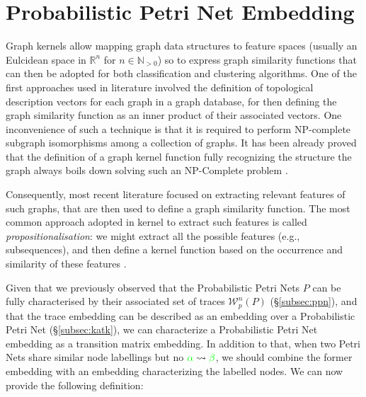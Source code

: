 \section{Probabilistic Petri Net Embedding}
Graph kernels allow mapping graph data structures to feature spaces (usually an Eulcidean space in $\mathbb{R}^n$ for $n\in \mathbb{N}_{>0}$) \cite{Samatova} so to express graph similarity functions that can then be adopted for both classification \cite{TsudaS10} and clustering \cite{Raedt} algorithms. One of the first approaches used in literature involved the definition of topological description vectors \cite{Sidere} for each graph in a graph database, for then defining the graph similarity function as an inner product of their associated vectors. One inconvenience of such a technique is that it is required to perform  NP-complete subgraph isomorphisms among a collection of graphs. It has been already proved that the definition of a graph kernel function fully recognizing the structure the graph always boils down solving such an NP-Complete problem \cite{GartnerFW03}. 


Consequently, most recent literature focused on extracting relevant features of such graphs, that are then used to define a graph similarity function. The most common approach adopted in kernel to extract such features is called \textit{propositionalisation}: we might extract all the possible features (e.g., subsequences), and then define a kernel function based on the occurrence and similarity of these features \cite{Gartner03}. 

Given that we previously observed that the Probabilistic Petri Nets $P$ can be fully characterised by their associated set of traces $\mathcal{W}_p^n(P)$ (\S\ref{subsec:ppn}), and that the trace embedding can be described as an embedding over a Probabilistic Petri Net (\S\ref{subsec:katk}), we can characterize a Probabilistic Petri Net embedding as a transition matrix embedding. In addition to that, when two Petri Nets share similar node labellings but no ${\color{green}\alpha}\rightsquigarrow{\color{green}\beta}$, we should combine the former embedding with an embedding characterizing the labelled nodes. We can now provide the following definition:

